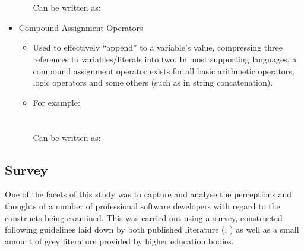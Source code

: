 \documentclass{article}
\begin{document}
\begin{itemize}
\begin{itemize}
                \\\\
                Can be written as:\\
            \end{itemize}
        \item Compound Assignment Operators
            \begin{itemize}
                \item Used to effectively ``append'' to a variable's value, compressing three references to variables/literals into two. In most supporting languages, a compound assignment operator exists for all basic arithmetic operators, logic operators and some others (such as in string concatenation).
                \item For example:\\
                \\\\
                Can be written as:\\
            \end{itemize}
    \end{itemize}

    \subsection{Survey}
        One of the facets of this study was to capture and analyse the perceptions and thoughts of a number of professional software developers with regard to the constructs being examined. This was carried out using a survey, constructed following guidelines laid down by both published literature (\cite{goodSurveys1}, \cite{goodSurveys2}) as well as a small amount of grey literature provided by higher education bodies.
\end{document}
